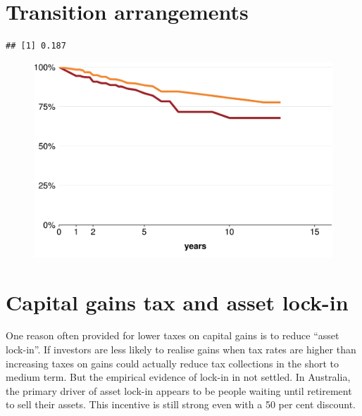 \documentclass{grattan}\usepackage[]{graphicx}\usepackage[]{color}
\makeatletter
\newenvironment{kframe}{%
 \def\at@end@of@kframe{}%
 \ifinner\ifhmode%
  \def\at@end@of@kframe{\end{minipage}}%
  \begin{minipage}{\columnwidth}%
 \fi\fi%
 \def\FrameCommand##1{\hskip\@totalleftmargin \hskip-\fboxsep
 \colorbox{shadecolor}{##1}\hskip-\fboxsep
     \hskip-\linewidth \hskip-\@totalleftmargin \hskip\columnwidth}%
 \MakeFramed {\advance\hsize-\width
   \@totalleftmargin\z@ \linewidth\hsize
   \@setminipage}}%
 {\par\unskip\endMakeFramed%
 \at@end@of@kframe}
\newenvironment{knitrout}{}{} %
\makeatother
\begin{document}
\chapter{Transition arrangements}




\begin{knitrout}
\color{fgcolor}\begin{kframe}
\begin{verbatim}
## [1] 0.187
\end{verbatim}
\end{kframe}
\end{knitrout}
\begin{figure}

\includegraphics[width=\columnwidth]{CGT-NG-atlas//NG-survival-curve-1}

\end{figure}
\printbibliography[title=References]


\appendix
\chapter{Capital gains tax and asset lock-in}
One reason often provided for lower taxes on capital gains is to reduce ``asset lock-in''. If investors are less likely to realise gains when tax rates are higher than increasing taxes on gains could actually reduce tax collections in the short to medium term. But the empirical evidence of lock-in in not settled. In Australia, the primary driver of asset lock-in appears to be people waiting until retirement to sell their assets. This incentive is still strong even with a 50 per cent discount. 
\end{document}
